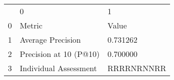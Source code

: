 \begin{tabular}{lll}
 & 0 & 1 \\
0 & Metric & Value \\
1 & Average Precision & 0.731262 \\
2 & Precision at 10 (P@10) & 0.700000 \\
3 & Individual Assessment & RRRRNRNNRR \\
\end{tabular}
